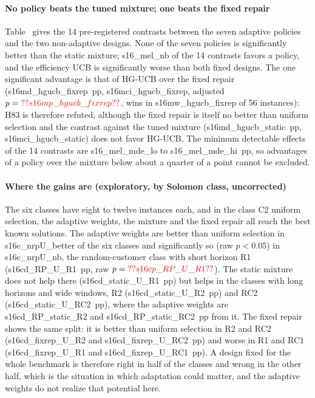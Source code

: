 \paragraph{No policy beats the tuned mixture; one beats the fixed repair} Table~ gives the 14 pre-registered contrasts between the seven adaptive policies and the two non-adaptive designs. None of the seven policies is significantly better than the static mixture; \num{s16_mel_nb} of the 14 contrasts favors a policy, and the efficiency UCB is significantly worse than both fixed designs. The one significant advantage is that of HG-UCB over the fixed repair (\num{s16md_hgucb_fixrep}~pp, \num{s16mci_hgucb_fixrep}, adjusted $p=\num{s16mp_hgucb_fixrep}$, wins in \num{s16mw_hgucb_fixrep} of 56 instances): H83 is therefore refuted, although the fixed repair is itself no better than uniform selection and the contrast against the tuned mixture (\num{s16md_hgucb_static}~pp, \num{s16mci_hgucb_static}) does not favor HG-UCB. The minimum detectable effects of the 14 contrasts are \num{s16_mel_mde_lo} to \num{s16_mel_mde_hi}~pp, so advantages of a policy over the mixture below about a quarter of a point cannot be excluded.

\paragraph{Where the gains are (exploratory, by Solomon class, uncorrected)} The six classes have eight to twelve instances each, and in the class C2 uniform selection, the adaptive weights, the mixture and the fixed repair all reach the best known solutions. The adaptive weights are better than uniform selection in \num{s16c_nrpU_better} of the six classes and significantly so (raw $p<0.05$) in \num{s16c_nrpU_nb}, the random-customer class with short horizon R1 (\num{s16cd_RP_U_R1}~pp, raw $p=\num{s16cp_RP_U_R1}$). The static mixture does not help there (\num{s16cd_static_U_R1}~pp) but helps in the classes with long horizons and wide windows, R2 (\num{s16cd_static_U_R2}~pp) and RC2 (\num{s16cd_static_U_RC2}~pp), where the adaptive weights are \num{s16cd_RP_static_R2} and \num{s16cd_RP_static_RC2}~pp from it. The fixed repair shows the same split: it is better than uniform selection in R2 and RC2 (\num{s16cd_fixrep_U_R2} and \num{s16cd_fixrep_U_RC2}~pp) and worse in R1 and RC1 (\num{s16cd_fixrep_U_R1} and \num{s16cd_fixrep_U_RC1}~pp). A design fixed for the whole benchmark is therefore right in half of the classes and wrong in the other half, which is the situation in which adaptation could matter, and the adaptive weights do not realize that potential here.

